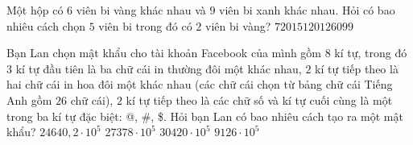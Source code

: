\begin{ex}%
	Một hộp có  $6$ viên bi vàng khác nhau và $9$ viên bi xanh khác nhau. Hỏi có bao nhiêu cách chọn $5$ viên bi trong đó có $2$ viên bi vàng?
	\choice
	{$720$}{$15120$}{\True $1260$}{$99$}
\end{ex}


\begin{ex}%
	Bạn Lan chọn mật khẩu cho tài khoản Facebook của mình gồm $8$ kí tự, trong đó $3$ kí tự đầu tiên là ba chữ cái in thường đôi một khác nhau, $2$ kí tự tiếp theo là hai chữ cái in hoa đôi một khác nhau (các chữ cái chọn từ bảng chữ cái Tiếng Anh gồm $26$ chữ cái), $2$ kí tự tiếp theo là các chữ số và kí tự cuối cùng là một trong ba kí tự đặc biệt: @, \#, \$. Hỏi bạn Lan có bao nhiêu cách tạo ra một mật khẩu?
	\choice
	{$24640{,}2\cdot 10^{5}$}
	{$27378\cdot 10^{5}$}
	{\True $30420\cdot 10^{5}$}
	{$9126\cdot 10^{5}$}
\end{ex}


